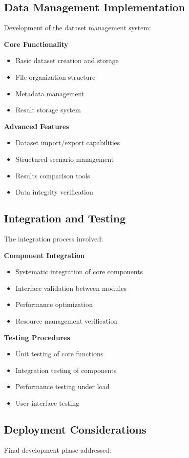 \subsection{Data Management Implementation}
Development of the dataset management system:

\textbf{Core Functionality}
\begin{itemize}
    \item Basic dataset creation and storage
    \item File organization structure
    \item Metadata management
    \item Result storage system
\end{itemize}

\textbf{Advanced Features}
\begin{itemize}
    \item Dataset import/export capabilities
    \item Structured scenario management
    \item Results comparison tools
    \item Data integrity verification
\end{itemize}

\subsection{Integration and Testing}
The integration process involved:

\textbf{Component Integration}
\begin{itemize}
    \item Systematic integration of core components
    \item Interface validation between modules
    \item Performance optimization
    \item Resource management verification
\end{itemize}

\textbf{Testing Procedures}
\begin{itemize}
    \item Unit testing of core functions
    \item Integration testing of components
    \item Performance testing under load
    \item User interface testing
\end{itemize}

\subsection{Deployment Considerations}
Final development phase addressed:

